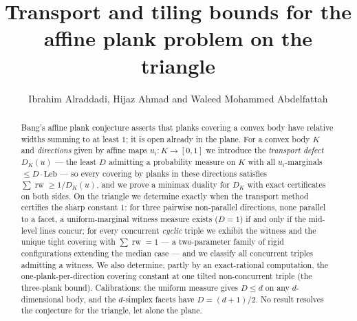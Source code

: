 \documentclass{aims}
\numberwithin{equation}{section}
\theoremstyle{plain}
\theoremstyle{definition}
\theoremstyle{remark}
\newcommand{\rw}{\operatorname{rw}}
\begin{document}
\title{Transport and tiling bounds for the affine plank problem on the triangle}

\author{Ibrahim Alraddadi\corrauth,
Hijaz Ahmad
and
Waleed Mohammed Abdelfattah}

\address{%
}


\begin{abstract}
Bang's affine plank conjecture asserts that planks covering a convex body have
relative widths summing to at least $1$; it is open already in the plane. For a
convex body $K$ and \emph{directions} given by affine maps $u_i:K\to[0,1]$ we
introduce the \emph{transport defect} $D_K(u)$ --- the least $D$ admitting a
probability measure on $K$ with all $u_i$-marginals $\le D\cdot\mathrm{Leb}$
--- so every covering by planks in these directions satisfies
$\sum\rw\ge1/D_K(u)$, and we prove a minimax duality for $D_K$ with exact
certificates on both sides. On the triangle we determine exactly when the
transport method certifies the sharp constant $1$: for three pairwise
non-parallel directions, none parallel to a facet, a uniform-marginal witness
measure exists ($D=1$) if and only if the mid-level lines concur; for every concurrent \emph{cyclic}
triple we exhibit the witness and the unique tight covering with $\sum\rw=1$
--- a two-parameter family of rigid configurations extending the median case
--- and we classify all concurrent triples admitting a witness. We also
determine, partly by an exact-rational computation, the one-plank-per-direction
covering constant at one tilted non-concurrent triple (the three-plank bound).
Calibrations: the uniform measure gives $D\le d$ on any $d$-dimensional body,
and the $d$-simplex facets have $D=(d+1)/2$. No result resolves the conjecture
for the triangle, let alone the plane.
\end{abstract}
\end{document}
